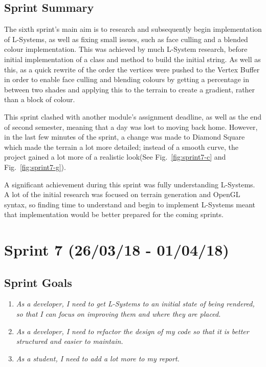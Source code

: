 \documentclass[a4paper,10pt]{report}
\begin{document}
\subsection{Sprint Summary}

The sixth sprint's main aim is to research and subsequently begin implementation of L-Systems, as well as fixing small issues, such as face culling and a blended colour implementation. This was achieved by much L-System research, before initial implementation of a class and method to build the initial string. As well as this, as a quick rewrite of the order the vertices were pushed to the Vertex Buffer in order to enable face culling and blending colours by getting a percentage in between two shades and applying this to the terrain to create a gradient, rather than a block of colour. \medskip

This sprint clashed with another module's assignment deadline, as well as the end of second semester, meaning that a day was lost to moving back home. However, in the last few minutes of the sprint, a change was made to Diamond Square which made the terrain a lot more detailed; instead of a smooth curve, the project gained a lot more of a realistic look(See Fig.~\ref{fig:sprint7-c} and Fig.~\ref{fig:sprint7-g}). \medskip

A significant achievement during this sprint was fully understanding L-Systems. A lot of the initial research was focused on terrain generation and OpenGL syntax, so finding time to understand and begin to implement L-Systems meant that implementation would be better prepared for the coming sprints.

\clearpage
\section{Sprint 7 (26/03/18 -  01/04/18)}

\subsection{Sprint Goals}

\begin{enumerate}

\item \textit{As a developer, I need to get L-Systems to an initial state of being rendered, so that I can focus on improving them and where they are placed.}

\item \textit{As a developer, I need to refactor the design of my code so that it is better structured and easier to maintain.}

\item \textit{As a student, I need to add a lot more to my report. }
\end{enumerate}
\end{document}
